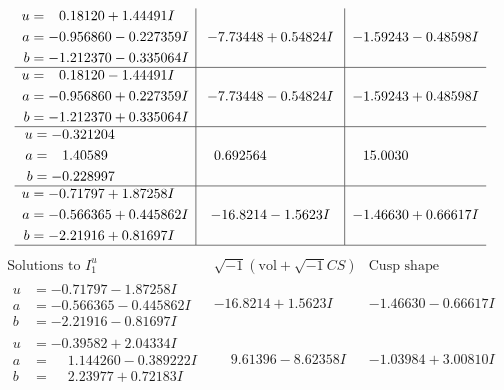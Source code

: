 \documentclass[1p]{elsarticle_modified}
\theoremstyle{definition}
\newcommand{\I}{\sqrt{-1}}
\begin{document}
$$\begin{array}{c|c|c}
\begin{aligned}
u &= \phantom{-}0.18120 + 1.44491 I \\
a &= -0.956860 - 0.227359 I \\
b &= -1.212370 - 0.335064 I\end{aligned}
 & -7.73448 + 0.54824 I & -1.59243 - 0.48598 I \\ \hline\begin{aligned}
u &= \phantom{-}0.18120 - 1.44491 I \\
a &= -0.956860 + 0.227359 I \\
b &= -1.212370 + 0.335064 I\end{aligned}
 & -7.73448 - 0.54824 I & -1.59243 + 0.48598 I \\ \hline\begin{aligned}
u &= -0.321204\phantom{ +0.000000I} \\
a &= \phantom{-}1.40589\phantom{ +0.000000I} \\
b &= -0.228997\phantom{ +0.000000I}\end{aligned}
 & \phantom{-}0.692564\phantom{ +0.000000I} & \phantom{-}15.0030\phantom{ +0.000000I} \\ \hline\begin{aligned}
u &= -0.71797 + 1.87258 I \\
a &= -0.566365 + 0.445862 I \\
b &= -2.21916 + 0.81697 I\end{aligned}
 & -16.8214 - 1.5623 I & -1.46630 + 0.66617 I\\
 \hline 
 \end{array}$$\newpage$$\begin{array}{c|c|c}  
\text{Solutions to }I^u_{1}& \I (\text{vol} + \sqrt{-1}CS) & \text{Cusp shape}\\
 \hline 
\begin{aligned}
u &= -0.71797 - 1.87258 I \\
a &= -0.566365 - 0.445862 I \\
b &= -2.21916 - 0.81697 I\end{aligned}
 & -16.8214 + 1.5623 I & -1.46630 - 0.66617 I \\ \hline\begin{aligned}
u &= -0.39582 + 2.04334 I \\
a &= \phantom{-}1.144260 - 0.389222 I \\
b &= \phantom{-}2.23977 + 0.72183 I\end{aligned}
 & \phantom{-}9.61396 - 8.62358 I & -1.03984 + 3.00810 I \\ \hline\begin{aligned}

\end{aligned}
\end{array}$$
\end{document}
